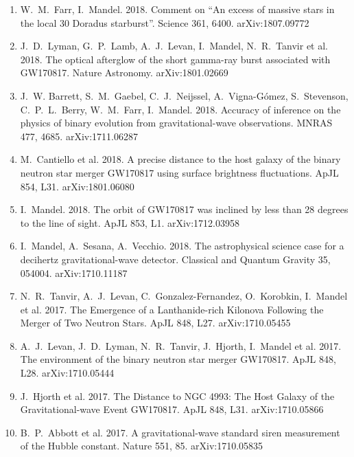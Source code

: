\documentclass[margin,line]{res}
\begin{document}
\begin{resume}
\begin{enumerate}
\item W.~M.~Farr, I.~Mandel.  2018.  Comment on ``An excess of massive stars in the local 30 Doradus starburst''.  Science 361, 6400.  arXiv:1807.09772

\item J.~D.~Lyman, G.~P.~Lamb, A.~J.~Levan, I.~Mandel, N.~R.~Tanvir et al.  2018. The optical afterglow of the short gamma-ray burst associated with GW170817.  Nature Astronomy. arXiv:1801.02669

\item J.~W. Barrett, S.~M.~Gaebel, C.~J.~Neijssel, A.~Vigna-G\'{o}mez, S.~Stevenson, C.~P.~L.~Berry, W.~M.~Farr, I.~Mandel.  2018.  Accuracy of inference on the physics of binary evolution from gravitational-wave observations.   MNRAS 477, 4685.  arXiv:1711.06287

\item M.~Cantiello et al. 2018.  A precise distance to the host galaxy of the binary neutron star merger GW170817 using surface brightness fluctuations.  ApJL 854, L31.  arXiv:1801.06080

\item I.~Mandel.  2018. The orbit of GW170817 was inclined by less than 28 degrees to the line of sight.  ApJL 853, L1. arXiv:1712.03958

\item I.~Mandel, A.~Sesana, A.~Vecchio. 2018.  The astrophysical science case for a decihertz gravitational-wave detector.  Classical and Quantum Gravity 35, 054004. arXiv:1710.11187

\item N.~R.~Tanvir, A.~J.~Levan, C.~Gonzalez-Fernandez, O.~Korobkin, I.~Mandel et al. 2017.  The Emergence of a Lanthanide-rich Kilonova Following the Merger of Two Neutron Stars.  ApJL 848, L27.  arXiv:1710.05455 

\item A.~J.~Levan, J.~D.~Lyman, N.~R.~Tanvir, J.~Hjorth, I.~Mandel et al. 2017. The environment of the binary neutron star merger GW170817.  ApJL 848, L28.  arXiv:1710.05444

\item J.~Hjorth et al. 2017. The Distance to NGC 4993: The Host Galaxy of the Gravitational-wave Event GW170817.  ApJL 848, L31.  arXiv:1710.05866

\item B.~P.~Abbott et al. 2017.   A gravitational-wave standard siren measurement of the Hubble constant.  Nature 551, 85. arXiv:1710.05835


\end{enumerate}
\end{resume}
\end{document}
